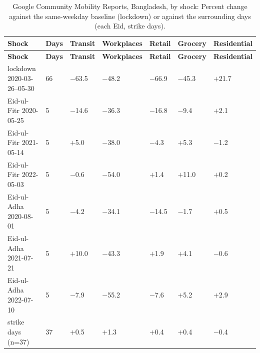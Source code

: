 \begingroup\small
\begin{longtable}{L{4.4cm} C{1.0cm} C{1.8cm} C{1.8cm} C{1.8cm} C{1.8cm} C{1.8cm}}
\caption{Google Community Mobility Reports, Bangladesh, by shock: Percent change against the same-weekday baseline (lockdown) or against the surrounding days (each Eid, strike days).}\label{tab:s-mobility}\\
\toprule
\textbf{Shock} & \textbf{Days} & \textbf{Transit} & \textbf{Workplaces} & \textbf{Retail} & \textbf{Grocery} & \textbf{Residential} \\
\midrule\endfirsthead
\toprule
\textbf{Shock} & \textbf{Days} & \textbf{Transit} & \textbf{Workplaces} & \textbf{Retail} & \textbf{Grocery} & \textbf{Residential} \\
\midrule\endhead
\bottomrule\endfoot
lockdown 2020-03-26--05-30 & 66 & $-$63.5 & $-$48.2 & $-$66.9 & $-$45.3 & $+$21.7 \\
Eid-ul-Fitr 2020-05-25 & 5 & $-$14.6 & $-$36.3 & $-$16.8 & $-$9.4 & $+$2.1 \\
Eid-ul-Fitr 2021-05-14 & 5 & $+$5.0 & $-$38.0 & $-$4.3 & $+$5.3 & $-$1.2 \\
Eid-ul-Fitr 2022-05-03 & 5 & $-$0.6 & $-$54.0 & $+$1.4 & $+$11.0 & $+$0.2 \\
Eid-ul-Adha 2020-08-01 & 5 & $-$4.2 & $-$34.1 & $-$14.5 & $-$1.7 & $+$0.5 \\
Eid-ul-Adha 2021-07-21 & 5 & $+$10.0 & $-$43.3 & $+$1.9 & $+$4.1 & $-$0.6 \\
Eid-ul-Adha 2022-07-10 & 5 & $-$7.9 & $-$55.2 & $-$7.6 & $+$5.2 & $+$2.9 \\
strike days (n=37) & 37 & $+$0.5 & $+$1.3 & $+$0.4 & $+$0.4 & $-$0.4 \\
\end{longtable}
\endgroup

